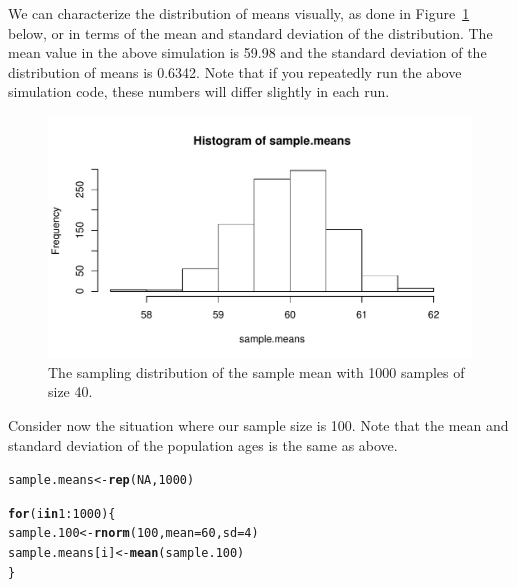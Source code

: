 \documentclass[12pt]{book}\usepackage[]{graphicx}\usepackage[]{color}
\makeatletter
\def\maxwidth{ %
  \ifdim\Gin@nat@width>\linewidth
    \linewidth
  \else
    \Gin@nat@width
  \fi
}
\newcommand{\hlnum}[1]{\textcolor[rgb]{0.686,0.059,0.569}{#1}}%
\newcommand{\hlopt}[1]{\textcolor[rgb]{0,0,0}{#1}}%
\newcommand{\hlstd}[1]{\textcolor[rgb]{0.345,0.345,0.345}{#1}}%
\newcommand{\hlkwa}[1]{\textcolor[rgb]{0.161,0.373,0.58}{\textbf{#1}}}%
\newcommand{\hlkwb}[1]{\textcolor[rgb]{0.69,0.353,0.396}{#1}}%
\newcommand{\hlkwc}[1]{\textcolor[rgb]{0.333,0.667,0.333}{#1}}%
\newcommand{\hlkwd}[1]{\textcolor[rgb]{0.737,0.353,0.396}{\textbf{#1}}}%
\newenvironment{kframe}{%
 \def\at@end@of@kframe{}%
 \ifinner\ifhmode%
  \def\at@end@of@kframe{\end{minipage}}%
  \begin{minipage}{\columnwidth}%
 \fi\fi%
 \def\FrameCommand##1{\hskip\@totalleftmargin \hskip-\fboxsep
 \colorbox{shadecolor}{##1}\hskip-\fboxsep
     \hskip-\linewidth \hskip-\@totalleftmargin \hskip\columnwidth}%
 \MakeFramed {\advance\hsize-\width
   \@totalleftmargin\z@ \linewidth\hsize
   \@setminipage}}%
 {\par\unskip\endMakeFramed%
 \at@end@of@kframe}
\newenvironment{knitrout}{}{} %
\makeatother
\begin{document}
We can characterize the distribution of means visually, as
done in Figure~\ref{fig:sdsmplot40} below, or in terms of the mean and
standard deviation of the distribution. The mean value in
the above simulation is 59.98 and the
standard deviation of the distribution of means is
0.6342. Note that if you repeatedly run the above simulation code, 
these numbers will differ slightly in each run.


\begin{figure}[!htbp]
  \centering
\begin{knitrout}
\color{fgcolor}
\includegraphics[width=\maxwidth]{figure/unnamed-chunk-16-1} 

\end{knitrout}
  \caption{The sampling distribution of the sample mean with 1000 samples
    of size 40.}
  \label{fig:sdsmplot40}
\end{figure}

Consider now the situation where our sample size is 100. Note that the
mean and standard deviation of the population ages is the same as
above.

\begin{knitrout}
\color{fgcolor}\begin{kframe}
\begin{alltt}
\hlstd{sample.means} \hlkwb{<-} \hlkwd{rep}\hlstd{(}\hlnum{NA}\hlstd{,}\hlnum{1000}\hlstd{)}

\hlkwa{for}\hlstd{(i} \hlkwa{in} \hlnum{1}\hlopt{:}\hlnum{1000}\hlstd{)\{}
  \hlstd{sample.100} \hlkwb{<-} \hlkwd{rnorm}\hlstd{(}\hlnum{100}\hlstd{,}\hlkwc{mean}\hlstd{=}\hlnum{60}\hlstd{,}\hlkwc{sd}\hlstd{=}\hlnum{4}\hlstd{)}
  \hlstd{sample.means[i]} \hlkwb{<-} \hlkwd{mean}\hlstd{(sample.100)}
\hlstd{\}}
\end{alltt}
\end{kframe}
\end{knitrout}
\end{document}
